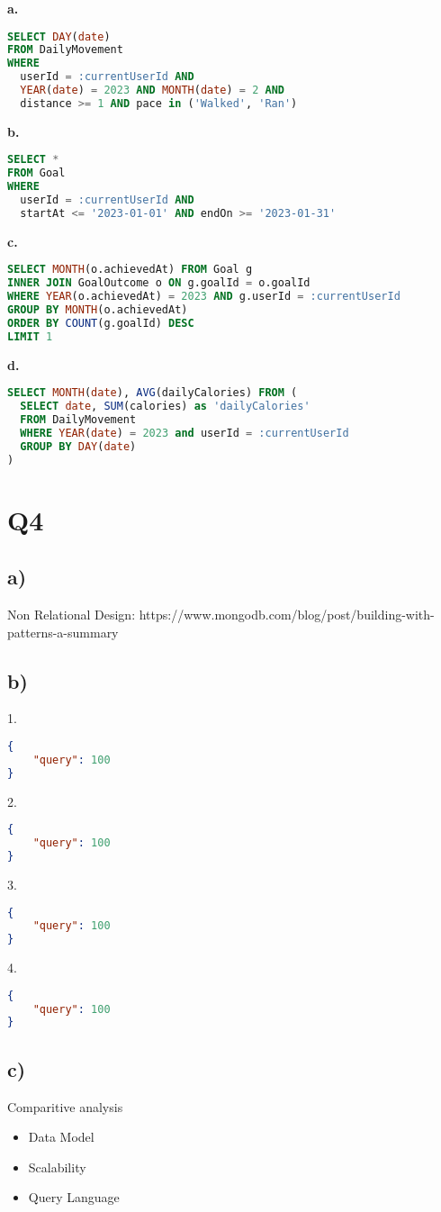 \documentclass{article}
\begin{document}
\textbf{\small{a.}}
\begin{lstlisting}[language=sql]
SELECT DAY(date) 
FROM DailyMovement 
WHERE 
  userId = :currentUserId AND 
  YEAR(date) = 2023 AND MONTH(date) = 2 AND 
  distance >= 1 AND pace in ('Walked', 'Ran')
\end{lstlisting}
\textbf{\small{b.}}
\begin{lstlisting}[language=sql]
SELECT * 
FROM Goal 
WHERE 
  userId = :currentUserId AND 
  startAt <= '2023-01-01' AND endOn >= '2023-01-31'
\end{lstlisting}
\textbf{\small{c.}}
\begin{lstlisting}[language=sql]
SELECT MONTH(o.achievedAt) FROM Goal g
INNER JOIN GoalOutcome o ON g.goalId = o.goalId 
WHERE YEAR(o.achievedAt) = 2023 AND g.userId = :currentUserId
GROUP BY MONTH(o.achievedAt)
ORDER BY COUNT(g.goalId) DESC
LIMIT 1
\end{lstlisting}
\textbf{\small{d.}}
\begin{lstlisting}[language=sql]
SELECT MONTH(date), AVG(dailyCalories) FROM (
  SELECT date, SUM(calories) as 'dailyCalories'
  FROM DailyMovement 
  WHERE YEAR(date) = 2023 and userId = :currentUserId
  GROUP BY DAY(date)
)
\end{lstlisting}

\pagebreak

\section*{Q4}

\subsection*{\small a)}

Non Relational Design: https://www.mongodb.com/blog/post/building-with-patterns-a-summary

\subsection*{\small b)}

\hspace{0cm}1.
\begin{lstlisting}[language=json]
{
    "query": 100
} 
\end{lstlisting} 
\hspace{0cm}2.
\begin{lstlisting}[language=json]
{                   
    "query": 100
}
\end{lstlisting}
\hspace{0cm}3. 
\begin{lstlisting}[language=json]
{
    "query": 100
}
\end{lstlisting}
\hspace{0cm}4. 
\begin{lstlisting}[language=json]
{
    "query": 100
}
\end{lstlisting}

\subsection*{\small c)}

Comparitive analysis
\begin{itemize}
\item Data Model
\item Scalability
\item Query Language
\end{itemize}
\end{document}
